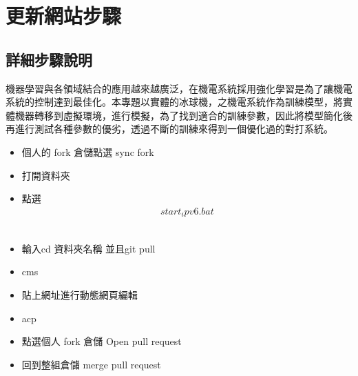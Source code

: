 \chapter{更新網站步驟}
\renewcommand{\baselinestretch}{10.0} %
\setcounter{page}{1}  %
\fontsize{14pt}{2.5pt}\sectionef
\section{詳細步驟說明}
機器學習與各領域結合的應用越來越廣泛，在機電系統採用強化學習是為了讓機電系統的控制達到最佳化。本專題以實體的冰球機，之機電系統作為訓練模型，將實體機器轉移到虛擬環境，進行模擬，為了找到適合的訓練參數，因此將模型簡化後再進行測試各種參數的優劣，透過不斷的訓練來得到一個優化過的對打系統。\\
\begin{itemize}
\item 個人的 fork 倉儲點選 sync fork 
\item 打開資料夾 
\item 點選 
\[
\begin{aligned}
start_ipv6.bat 
\end{aligned}
\]\\
\item 輸入cd 資料夾名稱 並且git pull 
\item cms 
\item 貼上網址進行動態網頁編輯 
\item acp 
\item 點選個人 fork 倉儲 Open pull request 
\item 回到整組倉儲 merge pull request
\end{itemize}
